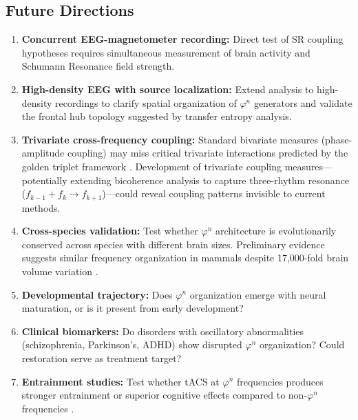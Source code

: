 \documentclass[11pt,a4paper]{article}
\newcommand{\phisym}{\varphi}
\begin{document}
\subsection{Future Directions}

\begin{enumerate}
    \item \textbf{Concurrent EEG-magnetometer recording:} Direct test of SR coupling hypotheses requires simultaneous measurement of brain activity and Schumann Resonance field strength.

    \item \textbf{High-density EEG with source localization:} Extend analysis to high-density recordings to clarify spatial organization of $\phisym^n$ generators and validate the frontal hub topology suggested by transfer entropy analysis.

    \item \textbf{Trivariate cross-frequency coupling:} Standard bivariate measures (phase-amplitude coupling) may miss critical trivariate interactions predicted by the golden triplet framework \parencite{kramer2022golden}. Development of trivariate coupling measures---potentially extending bicoherence analysis to capture three-rhythm resonance ($f_{k-1} + f_k \rightarrow f_{k+1}$)---could reveal coupling patterns invisible to current methods.

    \item \textbf{Cross-species validation:} Test whether $\phisym^n$ architecture is evolutionarily conserved across species with different brain sizes. Preliminary evidence suggests similar frequency organization in mammals despite 17,000-fold brain volume variation \parencite{buzsaki2013scaling}.

    \item \textbf{Developmental trajectory:} Does $\phisym^n$ organization emerge with neural maturation, or is it present from early development?

    \item \textbf{Clinical biomarkers:} Do disorders with oscillatory abnormalities (schizophrenia, Parkinson's, ADHD) show disrupted $\phisym^n$ organization? Could restoration serve as treatment target?

    \item \textbf{Entrainment studies:} Test whether tACS at $\phisym^n$ frequencies produces stronger entrainment or superior cognitive effects compared to non-$\phisym^n$ frequencies \parencite{herrmann2016eeg}.


\end{enumerate}
\end{document}
